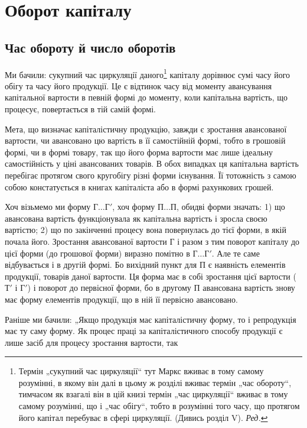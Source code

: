 
\chapter{Оборот капіталу}

\section{Час обороту й число оборотів}

\label{original-104}
Ми бачили: сукупний час циркуляції даного\footnote*{
Термін „сукупний час циркуляції“ тут Маркс вживає в тому самому розумінні,
в якому він далі в цьому ж розділі вживає термін „час обороту“, тимчасом
як взагалі він в цій книзі термін „час циркуляції“ вживає в тому самому
розумінні, що і „час обігу“, тобто в розумінні того часу, що протягом його капітал
перебуває в сфері циркуляції. (Дивись розділ V). \emph{Ред.}
} капіталу дорівнює сумі
часу його обігу та часу його продукції. Це є відтинок часу від моменту
авансування капітальної вартости в певній формі до моменту, коли капітальна
вартість, що процесує, повертається в тій самій формі.

Мета, що визначає капіталістичну продукцію, завжди є зростання
авансованої вартости, чи авансовано цю вартість в її самостійній формі,
тобто в грошовій формі, чи в формі товару, так що його форма вартости
має лише ідеальну самостійність у ціні авансованих товарів.
В обох випадках ця капітальна вартість перебігає протягом свого кругобігу
різні форми існування. Її тотожність з самою собою констатується
в книгах капіталіста або в формі рахункових грошей.

Хоч візьмемо ми форму $Г\dots{} Г'$, хоч форму $П\dots{} П$, обидві форми
значать: 1) що авансована вартість функціонувала як капітальна вартість
і зросла своєю вартістю; 2) що по закінченні процесу вона повернулась
до тієї форми, в якій почала його. Зростання авансованої вартости $Г$ і
разом з тим поворот капіталу до цієї форми (до грошової форми) виразно
помітно в $Г\dots{} Г'$. Але те саме відбувається і в другій формі. Бо
вихідний пункт для $П$ є наявність елементів продукції, товарів даної
вартости. Ця форма має в собі зростання цієї вартости ($Т'$ і $Г'$) і поворот
до первісної форми, бо в другому $П$ авансована вартість
знову має форму елементів продукції, що в ній її первісно авансовано.

Раніше ми бачили: „Якщо продукція має капіталістичну форму, то
і репродукція має ту саму форму. Як процес праці за капіталістичного
способу продукції є лише засіб для процесу зростання вартости, так
\parbreak{}  %
